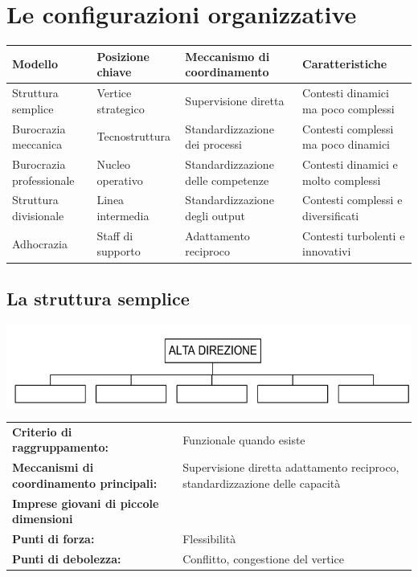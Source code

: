 \pagebreak

\section{Le configurazioni organizzative}

\begin{table}[h]
	\begin{tabular}{m{40mm} m{40mm}m{40mm}m{40mm}}
		\hline
		Modello                  & Posizione chiave   & Meccanismo di coordinamento        & Caratteristiche                     \\ \hline
		Struttura semplice       & Vertice strategico & Supervisione diretta               & Contesti dinamici ma poco complessi \\
		Burocrazia meccanica     & Tecnostruttura     & Standardizzazione dei processi     & Contesti complessi ma poco dinamici \\
		Burocrazia professionale & Nucleo operativo   & Standardizzazione delle competenze & Contesti dinamici e molto complessi \\
		Struttura divisionale    & Linea intermedia   & Standardizzazione degli output     & Contesti complessi e diversificati  \\
		Adhocrazia               & Staff di supporto  & Adattamento reciproco              & Contesti turbolenti e innovativi    \\ \hline
	\end{tabular}
\end{table}

\subsection{La struttura semplice}
\begin{center}
	\includegraphics[width=0.5\linewidth]{images/struttura_semplice}
\end{center}

\begin{tabular}{>{\bfseries}l p{90mm}}
	Criterio di raggruppamento: & Funzionale quando esiste
\\
	Meccanismi di coordinamento principali: & Supervisione diretta
	adattamento reciproco, standardizzazione delle capacità
\\
	Imprese giovani di piccole dimensioni
 & \\
	Punti di forza: & Flessibilità \\
	Punti di debolezza: & Conflitto, congestione del vertice \\
\end{tabular}


